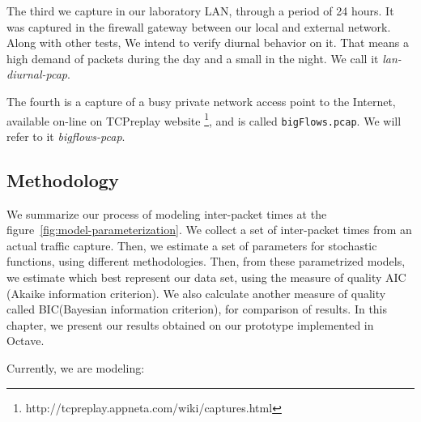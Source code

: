 The third we capture in our laboratory LAN, through a period of 24 hours. It was captured in the firewall gateway between our local and external network. Along with other tests, We intend to verify diurnal behavior on it. That means a high demand of packets during the day and a small in the night. We call it \textit{lan-diurnal-pcap}.

The fourth is a capture of a busy private network access point to the Internet, available on-line on TCPreplay\cite{web-tcpreplay} website \footnote{ http://tcpreplay.appneta.com/wiki/captures.html}, and is called \texttt{bigFlows.pcap}. We will refer to it \textit{bigflows-pcap}.



\subsection{Methodology}

We summarize our process of modeling inter-packet times at the figure~\ref{fig:model-parameterization}. We collect a set of inter-packet times from an actual traffic capture. Then, we estimate a set of parameters for stochastic functions, using different methodologies. Then, from these parametrized models, we estimate which best represent our data set, using the measure of quality AIC (Akaike information criterion). We also calculate another measure of quality called BIC(Bayesian information criterion), for comparison of results. In this chapter, we present our results obtained on our prototype implemented in Octave.

Currently, we are modeling:

